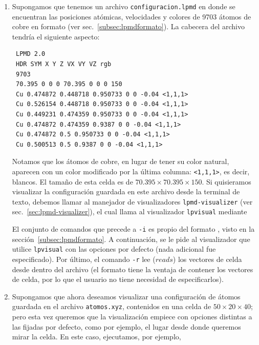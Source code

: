 \begin{enumerate}
\item Supongamos que tenemos un archivo \verb+configuracion.lpmd+ en donde se encuentran las posiciones at\'omicas, velocidades y colores de 9703 \'atomos de cobre en formato {\lpmd} (ver sec.~\ref{subsec:lpmdformato}). La cabecera del archivo tendr\'ia el siguiente aspecto:\\

 \begin{verbatim}
 LPMD 2.0
 HDR SYM X Y Z VX VY VZ rgb 
 9703
 70.395 0 0 0 70.395 0 0 0 150
 Cu 0.474872 0.448718 0.950733 0 0 -0.04 <1,1,1>
 Cu 0.526154 0.448718 0.950733 0 0 -0.04 <1,1,1>
 Cu 0.449231 0.474359 0.950733 0 0 -0.04 <1,1,1>
 Cu 0.474872 0.474359 0.9387 0 0 -0.04 <1,1,1>
 Cu 0.474872 0.5 0.950733 0 0 -0.04 <1,1,1>
 Cu 0.500513 0.5 0.9387 0 0 -0.04 <1,1,1>
 \end{verbatim}

Notamos que los \'atomos de cobre, en lugar de tener su color natural, aparecen con un color modificado por la \'ultima columna: \verb+<1,1,1>+, es decir, blancos. El tama\~no de esta celda es de $70.395\times70.395\times150$. Si quisieramos visualizar la configuraci\'on guardada en este archivo desde la terminal de texto, debemos llamar al manejador de visualizadores \verb+lpmd-visualizer+ (ver sec.~\ref{sec:lpmd-visualizer}), el cual llama al visualizador \verb+lpvisual+ mediante


El conjunto de comandos que precede a \verb+-i+ es propio del formato {\lpmd}, visto en la secci\'on~\ref{subsec:lpmdformato}. A continuaci\'on, se le pide al visualizador que utilice \verb+lpvisual+ con las opciones por defecto (nada adicional fue especificado). Por \'ultimo, el comando \verb+-r+ lee ($reads$) los vectores de celda desde dentro del archivo (el formato {\lpmd} tiene la ventaja de contener los vectores de celda, por lo que el usuario no tiene necesidad de especificarlos).

\item Supongamos que ahora deseamos visualizar una configuraci\'on de \'atomos guardada en el archivo \verb+atomos.xyz+, contenidos en una celda de $50\times20\times40$; pero esta vez queremos que la visualizaci\'on empiece con opciones distintas a las fijadas por defecto, como por ejemplo, el lugar desde donde queremos mirar la celda. En este caso, ejecutamos, por ejemplo,


\end{enumerate}
